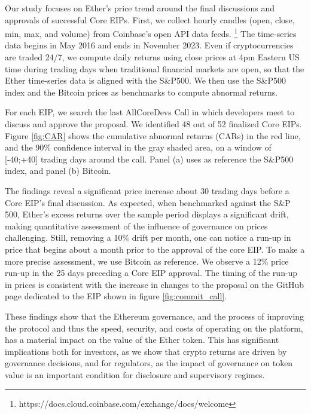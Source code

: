 \documentclass[No]{AEA}
\begin{document}
Our study focuses on Ether's price trend around the final discussions and approvals of successful Core EIPs. First, we collect hourly candles (open, close, min, max, and volume) from Coinbase's open API data feeds. \footnote{https://docs.cloud.coinbase.com/exchange/docs/welcome} The time-series data begins in May 2016 and ends in November 2023. Even if cryptocurrencies are traded 24/7, we compute daily returns using close prices at 4pm Eastern US time during trading days when traditional financial markets are open, so that the Ether time-series data is aligned with the S\&P500. We then use the S\&P500 index and the Bitcoin prices as benchmarks to compute abnormal returns. 

For each EIP, we search the last AllCoreDevs Call in which developers meet to discuss and approve the proposal. We identified 48 out of 52 finalized Core EIPs. Figure \ref{fig:CAR} shows the cumulative abnormal returns (CARs) in the red line, and the 90\% confidence interval in the gray shaded area, on a window of [-40;+40] trading days around the call. Panel (a) uses as reference the S\&P500 index, and panel (b) Bitcoin. 
 
The findings reveal a significant price increase about 30 trading days before a Core EIP's final discussion. As expected, when benchmarked against the S\&P 500, Ether's excess returns over the sample period displays a significant drift, making quantitative assessment of the influence of governance on prices challenging. Still, removing a 10\% drift per month, one can notice a run-up in price that begins about a month prior to the approval of the core EIP. To make a more precise assessment, we use Bitcoin as reference. We observe a 12\% price run-up in the 25 days preceding a Core EIP approval. The timing of the run-up in prices is consistent with the increase in changes to the proposal on the GitHub page dedicated to the EIP shown in figure \ref{fig:commit_call}.

These findings show that the Ethereum governance, and the process of improving the protocol and thus the speed, security, and costs of operating on the platform, has a material impact on the value of the Ether token. This has significant implications both for investors, as we show that crypto returns are driven by governance decisions, and for regulators, as the impact of governance on token value is an important condition for disclosure and supervisory regimes. 
\end{document}
